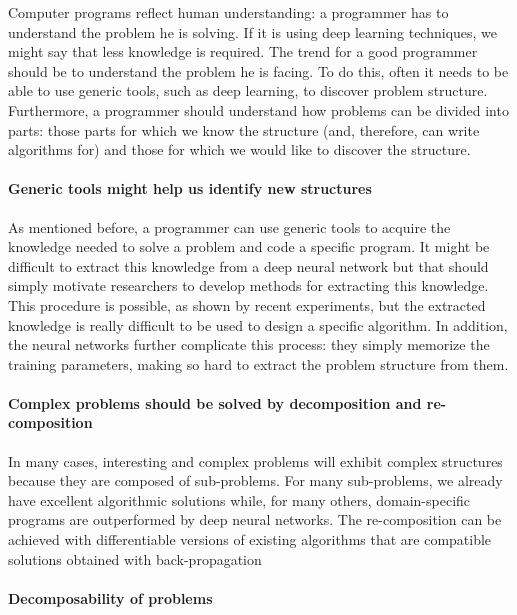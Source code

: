 Computer programs reflect human understanding: a programmer has to
understand the problem he is solving. If it is using deep learning
techniques, we might say that less knowledge is required. The trend for
a good programmer should be to understand the problem he is facing. To
do this, often it needs to be able to use generic tools, such as deep
learning, to discover problem structure. Furthermore, a programmer
should understand how problems can be divided into parts: those parts
for which we know the structure (and, therefore, can write algorithms
for) and those for which we would like to discover the structure.

\paragraph{Generic tools might help us identify new structures}

As mentioned before, a programmer can use generic tools to acquire the
knowledge needed to solve a problem and code a specific program. It
might be difficult to extract this knowledge from a deep neural network
but that should simply motivate researchers to develop methods for
extracting this knowledge. This procedure is possible, as shown by
recent experiments, but the extracted knowledge is really difficult to
be used to design a specific algorithm. In addition, the neural networks
further complicate this process: they simply memorize the training
parameters, making so hard to extract the problem structure from them.

\paragraph{Complex problems should be solved by decomposition and
re-composition}

In many cases, interesting and complex problems will exhibit complex
structures because they are composed of sub-problems. For many
sub-problems, we already have excellent algorithmic solutions while, for
many others, domain-specific programs are outperformed by deep neural
networks. The re-composition can be achieved with differentiable
versions of existing algorithms that are compatible solutions obtained
with back-propagation

\paragraph{Decomposability of problems}

